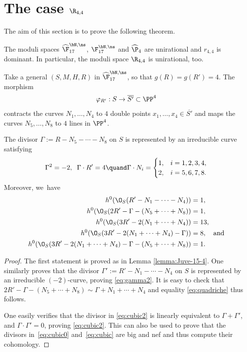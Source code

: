 \section{The case \texorpdfstring{$\R_{4,4}$}{R}}

The aim of this section is to prove the following theorem.

\begin{thm}\label{thm:4,4}
The moduli spaces $\widehat{\F}_{17}^{\bN,\ns}$, $\F_{17}^{\bN,\ns}$ and $\widehat\P_{4}$ are unirational and $r_{4,4}$ is dominant. In particular, the moduli space $\R_{4,4}$ is unirational, too.
\end{thm}

Take a general $(S,M,H,R)$ in $\widehat{\F}_{17}^{\bN,\ns}$, so that $g(R)=g(R')=4$. The morphism
\[
\varphi_{R'}:S \to \overline{S'}\subset \PP^4
\]
contracts the curves $N_1,\ldots,N_4$ to $4$ double points $x_1,\ldots,x_4\in \overline{S'}$ and maps the curves \linebreak $N_5,\ldots,N_8$ to $4$ lines in $\PP^4$.

\begin{lemma} \label{lemma:Juve-15-3}
The divisor
$
\Gamma:=R-N_5-\cdots-N_8
$
on $S$ is represented by an irreducible curve satisfying
\[
 \Gamma^2=-2, \;\; \Gamma\cdot R'=4 \quand \Gamma \cdot N_i =
\begin{cases}
1, & i=1,2,3,4, \\
2, & i=5,6,7,8.
\end{cases}
\]
Moreover, we~have
\begin{align}
\label{eq:gamma2}
h^0(\O_S(R'-N_1-\cdots-N_4))&=1, \\
\label{eq:quadriche} h^0(\O_S(2R'-\Gamma-(N_5+\cdots+N_8))&=1,\\
\label{eq:cubic0} h^0(\O_S(3R'-2(N_1+\cdots+N_4))&=13,\\
\label{eq:cubic} h^0(\O_S(3R'-2(N_1+\cdots+N_4)-\Gamma))&=8,\quad\text{and} \\
\label{eq:cubic2} h^0(\O_S(3R'-2(N_1+\cdots+N_4)-\Gamma-(N_5+\cdots+N_8))&=1.
\end{align}
\end{lemma}

\begin{proof}
The first statement is proved as in Lemma \ref{lemma:Juve-15-4}. One similarly proves that the divisor
$
\Gamma':=R'-N_1-\cdots-N_4
$
on $S$ is represented by an irreducible $(-2)$-curve, proving \eqref{eq:gamma2}. It is easy to check that $2R'-\Gamma-(N_5+\cdots+N_8)\sim \Gamma+N_1+\cdots+N_4$ and equality \eqref{eq:quadriche} thus follows.

One easily verifies that the divisor in \eqref{eq:cubic2} is linearly equivalent to $\Gamma +\Gamma'$, and $\Gamma \cdot \Gamma'=0$, proving \eqref{eq:cubic2}.
This can also be used to prove that the divisors in~\eqref{eq:cubic0} and~\eqref{eq:cubic} are big and nef and thus compute their cohomology.
\end{proof}

